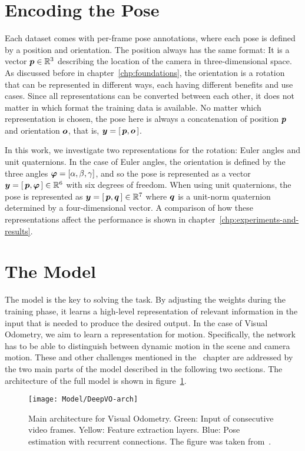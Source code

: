 			
	\section{Encoding the Pose}
		Each dataset comes with per-frame pose annotations, where each pose is defined by a position and orientation.
		The position always has the same format: It is a vector $\bm{p} \in \mathbb{R}^3$ describing the location of the camera in three-dimensional space.
		As discussed before in chapter~\ref{chp:foundations}, the orientation is a rotation that can be represented in different ways, each having different benefits and use cases.
		Since all representations can be converted between each other, it does not matter in which format the training data is available.
		No matter which representation is chosen, the pose here is always a concatenation of position $\bm{p}$ and orientation $\bm{o}$, that is, 
		$\bm{y} = \left[ \, \bm{p},  \bm{o} \, \right]$.
		
		In this work, we investigate two representations for the rotation: Euler angles and unit quaternions.
		In the case of Euler angles, the orientation is defined by the three angles 
		$\bm{\varphi} = \left[\alpha, \beta, \gamma\right]$, 
		and so the pose is represented as a vector
		$\bm{y} = \left[ \, \bm{p},  \bm{\varphi} \, \right] \in \mathbb{R}^6$ 
		with six degrees of freedom.
		When using unit quaternions, the pose is represented as 
		$\bm{y} = \left[ \, \bm{p},  \bm{q} \, \right] \in \mathbb{R}^7$ 
		where $\bm{q}$ is a unit-norm quaternion determined by a four-dimensional vector.
		A comparison of how these representations affect the performance is shown in chapter~\ref{chp:experiments-and-results}.
		
	\section{The Model}
		The model is the key to solving the task.
		By adjusting the weights during the training phase, it learns a high-level representation of relevant information in the input that is needed to produce the desired output.
		In the case of Visual Odometry, we aim to learn a representation for motion.
		Specifically, the network has to be able to distinguish between dynamic motion in the scene and camera motion.
		These and other challenges mentioned in the~ chapter are addressed by the two main parts of the model described in the following two sections.
		The architecture of the full model is shown in figure~\ref{fig:main-architecture}.
		\begin{figure}[t]
			\centering
			\texttt{[image: Model/DeepVO-arch]}
			\caption[Main architecture for Visual Odometry]
					{Main architecture for Visual Odometry.
					 Green: Input of consecutive video frames.
					 Yellow: Feature extraction layers.
					 Blue: Pose estimation with recurrent connections.
					 The figure was taken from~\cite{wang2017deepvo}.
					 \label{fig:main-architecture}}
		\end{figure}
		
